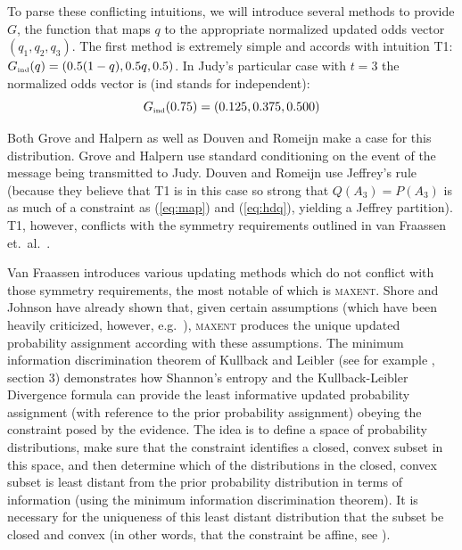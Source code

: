 \documentclass[12pt]{article}
\begin{document}
\nial To parse these conflicting intuitions, we will introduce several
methods to provide $G$, the function that maps $q$ to the appropriate
normalized updated odds vector $(q_{1},q_{2},q_{3})$. The first
method is extremely simple and accords with intuition T1:
$G_{\mbox{{\tiny ind}}}(q)=(0.5(1-q),0.5q,0.5)$. In Judy's particular
case with $t=3$ the normalized odds vector is (ind stands for
independent):
\begin{displaymath}
  G_{\mbox{{\tiny ind}}}(0.75)=(0.125,0.375,0.500)
\end{displaymath}

\nial Both Grove and Halpern  as well as
Douven and Romeijn  make a case for this
distribution. Grove and Halpern use standard conditioning on the event
of the message being transmitted to Judy. Douven and Romeijn use
Jeffrey's rule (because they believe that T1 is in this case so strong
that $Q(A_{3})=P(A_{3})$ is as much of a constraint as (\ref{eq:map})
and (\ref{eq:hdq}), yielding a Jeffrey partition). T1, however,
conflicts with the symmetry requirements outlined in van Fraassen et.\
al.\ .

Van Fraassen introduces various updating methods which do not conflict
with those symmetry requirements, the most notable of which is
\textsc{maxent}. Shore and Johnson have already shown that, given
certain assumptions (which have been heavily criticized, however,
e.g.\ \scite{7}{uffink96}{}), \textsc{maxent} produces the unique
updated probability assignment according with these assumptions. The
minimum information discrimination theorem of Kullback and Leibler
(see for example \scite{7}{csiszar67}{}, section 3) demonstrates how
Shannon's entropy and the Kullback-Leibler Divergence formula can
provide the least informative updated probability assignment (with
reference to the prior probability assignment) obeying the constraint
posed by the evidence. The idea is to define a space of probability
distributions, make sure that the constraint identifies a closed,
convex subset in this space, and then determine which of the
distributions in the closed, convex subset is least distant from the
prior probability distribution in terms of information (using the
minimum information discrimination theorem). It is necessary for the
uniqueness of this least distant distribution that the subset be
closed and convex (in other words, that the constraint be affine, see
\scite{7}{csiszar67}{}).
\end{document}
